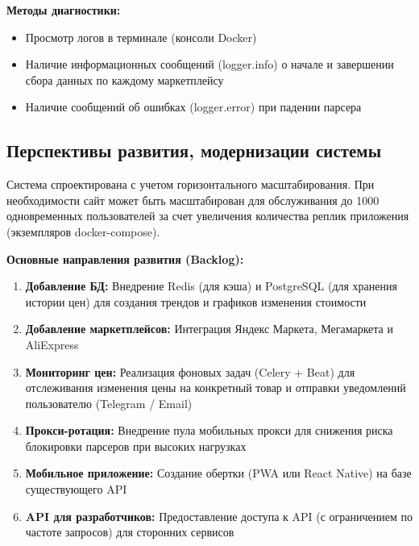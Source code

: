 \documentclass[a4paper,12pt]{article}
\begin{document}
\textbf{Методы диагностики:}
\begin{itemize}
	\item Просмотр логов в терминале (консоли Docker)
	\item Наличие информационных сообщений (logger.info) о начале и завершении сбора данных по каждому маркетплейсу
	\item Наличие сообщений об ошибках (logger.error) при падении парсера
\end{itemize}

\subsection{Перспективы развития, модернизации системы}

Система спроектирована с учетом горизонтального масштабирования. При необходимости сайт может быть масштабирован для обслуживания до 1000 одновременных пользователей за счет увеличения количества реплик приложения (экземпляров docker-compose).

\textbf{Основные направления развития (Backlog):}
\begin{enumerate}
	\item \textbf{Добавление БД:} Внедрение Redis (для кэша) и PostgreSQL (для хранения истории цен) для создания трендов и графиков изменения стоимости
	\item \textbf{Добавление маркетплейсов:} Интеграция Яндекс Маркета, Мегамаркета и AliExpress
	\item \textbf{Мониторинг цен:} Реализация фоновых задач (Celery + Beat) для отслеживания изменения цены на конкретный товар и отправки уведомлений пользователю (Telegram / Email)
	\item \textbf{Прокси-ротация:} Внедрение пула мобильных прокси для снижения риска блокировки парсеров при высоких нагрузках
	\item \textbf{Мобильное приложение:} Создание обертки (PWA или React Native) на базе существующего API
	\item \textbf{API для разработчиков:} Предоставление доступа к API (с ограничением по частоте запросов) для сторонних сервисов
\end{enumerate}
\end{document}

